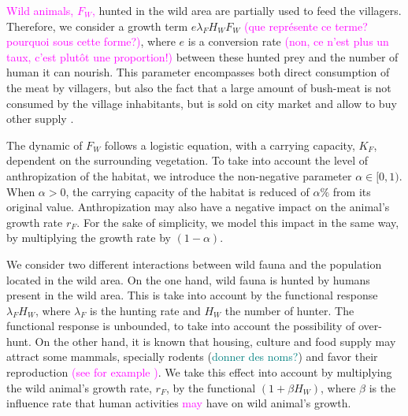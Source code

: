 \documentclass{article}
\newcommand{\lfw}{\lambda_{F}}
\newcommand{\lfw}{\lambda_{F}}
\newcommand{\marc}[1]{\textcolor{teal}{#1}}
\newcommand{\YD}[1]{\textcolor{magenta}{#1}}
\begin{document}
\YD{Wild animals, $F_W$,} hunted in the wild area are partially used to feed the villagers. Therefore, we consider a growth term $e \lfw H_W F_W$ \YD{(que représente ce terme? pourquoi sous cette forme?)}, where $e$ is a conversion rate \YD{(non, ce n'est plus un taux, c'est plutôt une proportion!)} between these hunted prey and the number of human it can nourish. This parameter encompasses both direct consumption of the meat by villagers, but also the fact that a large amount of bush-meat is not consumed by the village inhabitants, but is sold on city market and allow to buy other supply \cite{wilkie_bushmeat_1998}.


The dynamic of $F_W$ follows a logistic equation, with a carrying capacity, $K_F$, dependent on the surrounding vegetation. To take into account the level of anthropization of the habitat, we introduce the non-negative parameter $\alpha \in [0, 1)$. When $\alpha > 0$, the carrying capacity of the habitat is reduced of $\alpha \%$ from its original value. Anthropization may also have a negative impact on the animal's growth rate $r_F$. For the sake of simplicity, we model this impact in the same way, by multiplying the growth rate by $(1-\alpha)$.

We consider two different interactions between wild fauna and the population located in the wild area. On the one hand, wild fauna is hunted by humans present in the wild area. This is take into account by the functional response $\lfw H_W$, where $\lfw$ is the hunting rate and $H_W$ the number of hunter. The functional response is unbounded, to take into account the possibility of over-hunt. On the other hand, it is known that housing, culture and food supply may attract some mammals, specially rodents (\marc{donner des noms?}) and favor their reproduction \YD{(see for example \cite{dounias_foraging_2011, dobigny_zoonotic_2022})}. We take this effect into account by multiplying the wild animal's growth rate, $r_F$, by the functional $(1 +  \beta H_W)$, where $\beta$ is the influence rate that human activities \YD{may} have on wild animal's growth.
\end{document}
